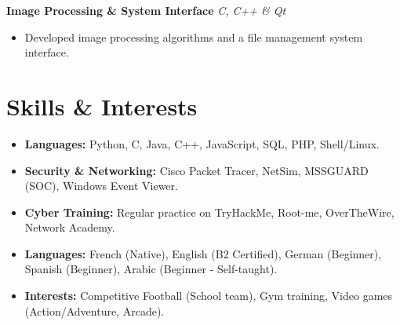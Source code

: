 \documentclass[10pt, a4paper]{article}
\begin{document}
\vspace{6pt}

\textbf{Image Processing \& System Interface} \hfill \textit{C, C++ \& Qt}
\begin{itemize}
    \item Developed image processing algorithms and a file management system interface.
\end{itemize}

\section{Skills \& Interests}
\begin{itemize}
    \item \textbf{Languages:} Python, C, Java, C++, JavaScript, SQL, PHP, Shell/Linux.
    \item \textbf{Security \& Networking:} Cisco Packet Tracer, NetSim, MSSGUARD (SOC), Windows Event Viewer.
    \item \textbf{Cyber Training:} Regular practice on TryHackMe, Root-me, OverTheWire, Network Academy.
    \item \textbf{Languages:} French (Native), English (B2 Certified), German (Beginner), Spanish (Beginner), Arabic (Beginner - Self-taught).
    \item \textbf{Interests:} Competitive Football (School team), Gym training, Video games (Action/Adventure, Arcade).
\end{itemize}
\end{document}
